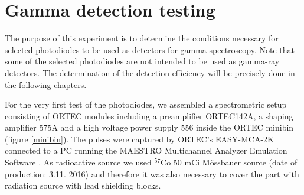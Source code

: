 \chapter{Gamma detection testing}
The purpose of this experiment is to determine the conditions necessary for selected photodiodes to be used as detectors for gamma spectroscopy. Note that some of the selected photodiodes are not intended to be used as gamma-ray detectors. The determination of the detection efficiency will be precisely done in the following chapters. 
\par
For the very first test of the photodiodes, we assembled a spectrometric setup consisting of ORTEC modules including a preamplifier ORTEC142A, a shaping amplifier 575A and a high voltage power supply 556 inside the ORTEC minibin (figure \ref{minibin}). The pulses were captured by ORTEC's EASY-MCA-2K connected to a PC running the MAESTRO Multichannel Analyzer Emulation Software \cite{maestro}. As radioactive source we used $^{57}$Co 50 mCi Mössbauer source (date of production: 3.11. 2016) and therefore it was also necessary to cover the part with radiation source with lead shielding blocks.


